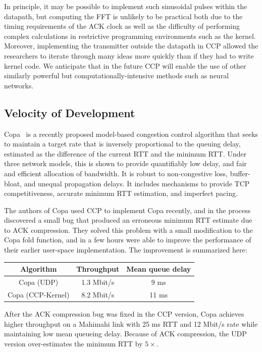 In principle, it may be possible to implement such sinusoidal pulses within the datapath, but computing the FFT is unlikely to be practical both due to the timing requirements of the ACK clock as well as the difficulty of performing complex calculations in restrictive programming environments such as the kernel. Moreover, implementing the transmitter outside the datapath in CCP allowed the researchers to iterate through many ideas more quickly than if they had to write kernel code.
We anticipate that in the future CCP will enable the use of other similarly powerful but computationally-intensive methods such as neural networks.

\subsection{Velocity of Development}
\label{s:capabilities:velocity}

Copa~\cite{copa} is a recently proposed model-based congestion control algorithm that seeks to maintain a target rate that is inversely proportional to the queuing delay, estimated as the difference of the current RTT and the minimum RTT. 
Under three network models, this is shown to provide quantifiably low delay, and fair and efficient allocation of bandwidth. 
It is robust to non-congestive loss, buffer-bloat, and unequal propagation delays. It includes mechanisms to provide TCP competitiveness, accurate minimum RTT estimation, and imperfect pacing. 

The authors of Copa used CCP to implement Copa recently, and in the process discovered a small bug that produced an erroneous minimum RTT estimate due to ACK compression. They solved this problem with a small modification to the Copa fold function,
and in a few hours were able to improve the performance of their earlier user-space implementation. The improvement is summarized here:\\

    \begin{tabular}{c|c|c}
        Algorithm & Throughput & Mean queue delay \\
        \hline
        Copa (UDP) & 1.3 Mbit/s & 9 ms\\
        Copa (CCP-Kernel) & 8.2 Mbit/s  & 11 ms\\
    \end{tabular}

\smallskip
After the ACK compression bug was fixed in the CCP version, Copa achieves higher throughput on a Mahimahi link with 25 ms RTT and 12 Mbit/s rate while maintaining low mean queueing delay. Because of ACK compression, the UDP version over-estimates the minimum RTT by $5\times$.

